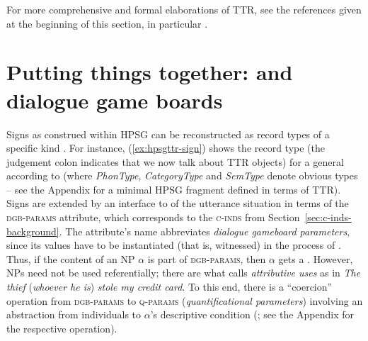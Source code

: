 \documentclass[output=paper
 	        ,biblatex
                ,babelshorthands
                ,newtxmath
                ,draftmode
                ,colorlinks, citecolor=brown
]{langscibook}
\begin{document}
For more comprehensive and formal elaborations of TTR, see the references given at the beginning of this section, in particular \citet{Cooper:ms}.



\section{Putting things together: \HPSGTTR and dialogue game boards}
\label{sec:hpsgttr-dialogue-game-boards}

Signs as construed within HPSG can be reconstructed as record types of a specific kind \citep{Cooper:2008}.
%
For instance, (\ref{ex:hpsgttr-sign}) shows the record type (the judgement colon indicates that we now talk about TTR objects) for a general  according to \citet{Pollard:Sag:1994} (where \emph{PhonType}, \emph{CategoryType} and \emph{SemType} denote obvious types -- see the Appendix for a minimal HPSG fragment defined in terms of TTR).
%
\ea \label{ex:hpsgttr-sign}
\z
%
Signs are extended by an interface to  of the utterance situation in terms of the \textsc{dgb-params} attribute, which corresponds to the \textsc{c-inds} from Section~\ref{sec:c-inds-background}.
%
The attribute's name abbreviates \emph{dialogue gameboard parameters}, since its values have to be instantiated (that is, witnessed) in the process of .
%
Thus, if the content of an NP $\alpha$ is part of \textsc{dgb-params}, then $\alpha$ gets a .
%
However, NPs need not be used referentially; there are what \citet{Donellan:1966} calls \emph{attributive uses} as in \emph{The thief} (\emph{whoever he is}) \emph{stole my credit card}.
%
To this end, there is a \enquote{coercion} operation from \textsc{dgb-params} to \textsc{q-params} (\emph{quantificational parameters}) involving an abstraction from individuals to $\alpha$'s descriptive condition (\citealt{Purver:Ginzburg:2004}; see the Appendix for the respective operation).
\end{document}

